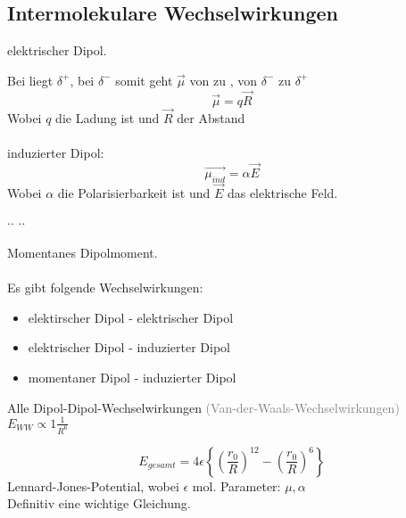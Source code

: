 \documentclass[a4paper]{article}
\begin{document}
\subsection{Intermolekulare Wechselwirkungen}
elektrischer Dipol.\\
\begin{center}
\end{center}
Bei  liegt $\delta^+$, bei  $\delta^-$ somit geht $\vec{\mu}$ von  zu , von $\delta^-$ zu $\delta^+$\\
\begin{equation*}
    \vec{\mu} = q \vec{R}
\end{equation*}
Wobei $q$ die Ladung ist und $\vec{R}$ der Abstand\\\\
induzierter Dipol:
\begin{equation*}
    \vec{\mu_{ind}}=\alpha \vec{E}
\end{equation*}
Wobei $\alpha$ die Polarisierbarkeit ist und $\vec{E}$ das elektrische Feld.\\
\begin{center}
    $\cdot$$\cdot$ \ce{->} $\cdot$$\cdot$
\end{center}
Momentanes Dipolmoment.\\\\
Es gibt folgende Wechselwirkungen:
\begin{itemize}
    \item elektirscher Dipol - elektrischer Dipol
    \item elektrischer Dipol - induzierter Dipol
    \item momentaner Dipol - induzierter Dipol
\end{itemize}
Alle Dipol-Dipol-Wechselwirkungen \textcolor{gray}{(Van-der-Waals-Wechselwirkungen)}\\
$E_{WW} \propto 1\frac{1}{R^6}$\\
\begin{equation*}
    E_{gesamt}=4\epsilon\left\{\left(\frac{r_0}{R}\right)^{12}-\left(\frac{r_0}{R}\right)^6\right\}
\end{equation*}
Lennard-Jones-Potential, wobei $\epsilon$ mol. Parameter: $\mu, \alpha$\\
Definitiv eine wichtige Gleichung.
\end{document}
